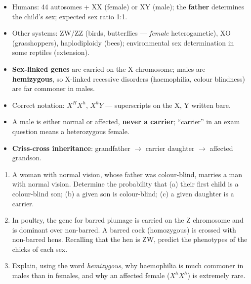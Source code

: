\documentclass[11pt]{article}
\begin{document}
\begin{aretenir}
\begin{itemize}
\item Humans: 44 autosomes + XX (female) or XY (male); the \textbf{father} determines the child's sex; expected sex ratio 1:1.
\item Other systems: ZW/ZZ (birds, butterflies --- \emph{female} heterogametic), XO (grasshoppers), haplodiploidy (bees); environmental sex determination in some reptiles (extension).
\item \textbf{Sex-linked genes} are carried on the X chromosome; males are \textbf{hemizygous}, so X-linked recessive disorders (haemophilia, colour blindness) are far commoner in males.
\item Correct notation: $X^H X^h$, $X^h Y$ --- superscripts on the X, Y written bare.
\item A male is either normal or affected, \textbf{never a carrier}; ``carrier'' in an exam question means a heterozygous female.
\item \textbf{Criss-cross inheritance}: grandfather $\rightarrow$ carrier daughter $\rightarrow$ affected grandson.
\end{itemize}
\end{aretenir}

\begin{exercice}[Practice]
\begin{enumerate}
\item A woman with normal vision, whose father was colour-blind, marries a man with normal vision. Determine the probability that (a) their first child is a colour-blind son; (b) a given son is colour-blind; (c) a given daughter is a carrier.
\item In poultry, the gene for barred plumage is carried on the Z chromosome and is dominant over non-barred. A barred cock (homozygous) is crossed with non-barred hens. Recalling that the hen is ZW, predict the phenotypes of the chicks of each sex.
\item Explain, using the word \emph{hemizygous}, why haemophilia is much commoner in males than in females, and why an affected female ($X^h X^h$) is extremely rare.
\end{enumerate}
\end{exercice}
\end{document}
